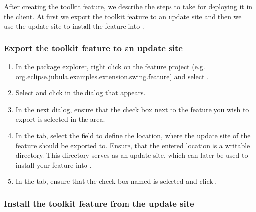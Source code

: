 After creating the toolkit feature, we describe the steps to take for deploying
it in the \app{} client. At first we export the toolkit feature to an update
site and then we use the update site to install the feature into \app{}.
 
\subsubsection{Export the toolkit feature to an update site}

\begin{enumerate}
\item In the package explorer, right click on the feature project 
 (e.g. org.eclipse.jubula.examples.extension.swing.feature) and
 select .
\item Select  and click
 in the dialog that appears.
\item In the next dialog, ensure that the check box next to the feature you wish
to export is selected in the  area.
\item In the  tab, select the 
 field to define the location, where the update site of the feature should be
 exported to. Ensure, that the entered location is a writable directory. This
 directory serves as an update site, which can later be used to install your
 feature into \app{}.
\item In the  tab, ensure that the check box named
 is selected and click
.
\end{enumerate}

\subsubsection{Install the toolkit feature from the update site}

